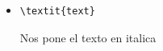 \documentclass[letterpaper, 12pt, oneside]{article}%
\begin{document}
\begin{enumerate}
\begin{itemize}
\begin{lstlisting}
\end{thebibliography}		
			\end{lstlisting} Nos sirve para agregar las referencias bibliograficas
			\item
			\begin{lstlisting} 
\textit{text}		
			\end{lstlisting} Nos pone el texto en italica
			
			
			
		\end{itemize}
		
		
		
		
	\end{enumerate}%
	
	
	
\end{document}
